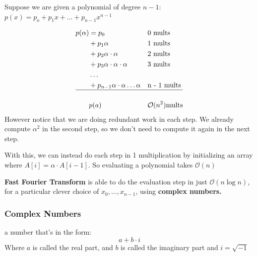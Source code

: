 \documentclass[12pt]{article}
\renewcommand{\O}{\mathcal{O}}
\begin{document}
\begin{lemma}
    Suppose we are given a polynomial of degree $n - 1$: $p(x) = p_o + p_1 x + \dots + p_{n - 1} x^{n - 1}$

    \begin{align*}
        p(\alpha) & = p_0                                        &  & \text{0 mults}       \\
                  & + p_1 \alpha                                 &  & \text{1 mults}       \\
                  & + p_2 \alpha \cdot \alpha                    &  & \text{2 mults}       \\
                  & + p_3 \alpha \cdot \alpha \cdot \alpha       &  & \text{3 mults}       \\
                  & \dots                                                                  \\
                  & + p_{n - 1} \alpha \cdot \alpha \dots \alpha &  & \text{n - 1 mults}   \\
        \hline                                                                             \\
                  & p(a)                                         &  & \O(n^2) \text{mults}
    \end{align*}
    However notice that we are doing redundant work in each step. We already compute $\alpha^2$ in the second step, so we don't need to compute it again in the next step.

    With this, we can instead do each step in 1 multiplication by initializing an array where $A[i] = \alpha \cdot A[i - 1]$. So evaluating a polynomial takes $\O(n)$

\end{lemma}

\textbf{Fast Fourier Transform} is able to do the evaluation step in just $\O(n \log n)$, for a particular clever choice of $x_0, \dots , x_{n - 1}$, using \textbf{complex numbers.}

\subsubsection{Complex Numbers}
\begin{definition}
    a number that's in the form:
    $$
        a + b \cdot i
    $$
    Where $a$ is called the real part, and $b$ is called the imaginary part and $i = \sqrt{-1}$
\end{definition}
\end{document}
